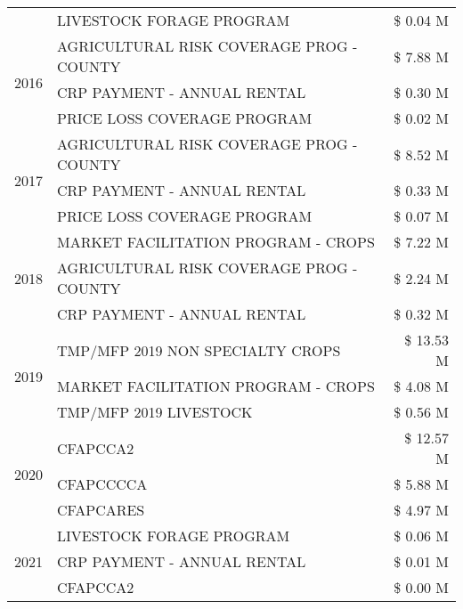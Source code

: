 \begin{tabular}{llr}
 & LIVESTOCK FORAGE PROGRAM & \$ 0.04 M \\
\cline{1-3}
\multirow[t]{3}{*}{2016} & AGRICULTURAL RISK COVERAGE PROG - COUNTY & \$ 7.88 M \\
 & CRP PAYMENT - ANNUAL RENTAL & \$ 0.30 M \\
 & PRICE LOSS COVERAGE PROGRAM & \$ 0.02 M \\
\cline{1-3}
\multirow[t]{3}{*}{2017} & AGRICULTURAL RISK COVERAGE PROG - COUNTY & \$ 8.52 M \\
 & CRP PAYMENT - ANNUAL RENTAL & \$ 0.33 M \\
 & PRICE LOSS COVERAGE PROGRAM & \$ 0.07 M \\
\cline{1-3}
\multirow[t]{3}{*}{2018} & MARKET FACILITATION PROGRAM - CROPS & \$ 7.22 M \\
 & AGRICULTURAL RISK COVERAGE PROG - COUNTY & \$ 2.24 M \\
 & CRP PAYMENT - ANNUAL RENTAL & \$ 0.32 M \\
\cline{1-3}
\multirow[t]{3}{*}{2019} & TMP/MFP 2019 NON SPECIALTY CROPS & \$ 13.53 M \\
 & MARKET FACILITATION PROGRAM - CROPS & \$ 4.08 M \\
 & TMP/MFP 2019 LIVESTOCK & \$ 0.56 M \\
\cline{1-3}
\multirow[t]{3}{*}{2020} & CFAPCCA2 & \$ 12.57 M \\
 & CFAPCCCCA & \$ 5.88 M \\
 & CFAPCARES & \$ 4.97 M \\
\cline{1-3}
\multirow[t]{3}{*}{2021} & LIVESTOCK FORAGE PROGRAM & \$ 0.06 M \\
 & CRP PAYMENT - ANNUAL RENTAL & \$ 0.01 M \\
 & CFAPCCA2 & \$ 0.00 M \\
\cline{1-3}
\bottomrule
\end{tabular}
